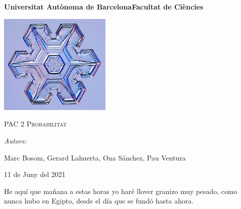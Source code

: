 \documentclass[12pt]{report}
\begin{document}
\begin{titlepage}
    \centering
    {\bfseries\LARGE Universitat Autònoma de Barcelona\newline Facultat de Ciències\par}
    \vspace{2cm}
    {\hspace{-1em}\includegraphics[width=0.4\textwidth]{flocgordi.png}\par}
    \vspace{1cm}
    {\scshape\Huge PAC 2 Probabilitat\par} %
    \vspace{1cm}
    {\Large \itshape Autors: \par}
    {\Large Marc Bosom, Gerard Lahuerta, Ona Sánchez, Pau Ventura \par}
    \vspace{1cm}
    {\Large 11 de Juny del 2021\par}
\end{titlepage}

\justifying

\thispagestyle{empty}
\hspace{6cm}
    \begin{minipage}{0.5\linewidth}
        \vspace{10cm}%
        {\small
            He aquí que mañana a estas horas yo haré llover granizo muy pesado, como nunca hubo en Egipto, desde el día que se fundó hasta ahora.
        }
        \vspace{5pt}%
    \end{minipage}
\end{document}
